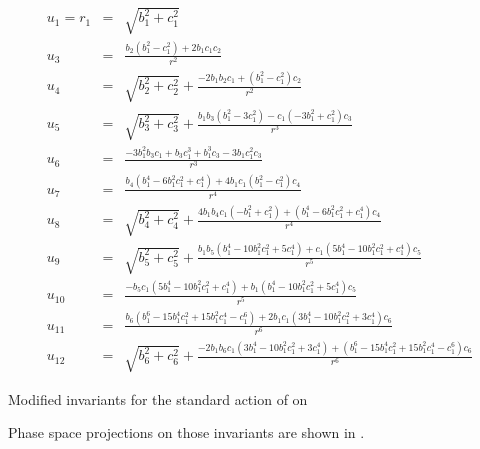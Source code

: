 \begin{table}
\begin{small}
\begin{eqnarray*}
  u_1=r_1 &=&\sqrt{b_1^2+c_1^2}\\ 
  u_3 &=&\frac{b_2 \left(b_1^2-c_1^2\right)+2 b_1 c_1 c_2}{r^2}\\ 
  u_4 &=&\sqrt{b_2^2+c_2^2}+\frac{-2
b_1 b_2 c_1+\left(b_1^2-c_1^2\right) c_2}{r^2}\\ 
  u_5 &=&\sqrt{b_3^2+c_3^2}+\frac{b_1 b_3 \left(b_1^2-3 c_1^2\right)-c_1 \left(-3
b_1^2+c_1^2\right) c_3}{r^3}\\ 
  u_6 &=&\frac{-3 b_1^2 b_3 c_1+b_3 c_1^3+b_1^3 c_3-3 b_1 c_1^2 c_3}{r^3}\\
  u_7 &=&\frac{b_4
\left(b_1^4-6 b_1^2 c_1^2+c_1^4\right)+4 b_1 c_1 \left(b_1^2-c_1^2\right) c_4}{r^4}\\
  u_8 &=&\sqrt{b_4^2+c_4^2}+\frac{4 b_1
b_4 c_1 \left(-b_1^2+c_1^2\right)+\left(b_1^4-6 b_1^2 c_1^2+c_1^4\right) c_4}{r^4}\\ 
  u_9 &=&\sqrt{b_5^2+c_5^2}+\frac{b_1
b_5 \left(b_1^4-10 b_1^2 c_1^2+5 c_1^4\right)+c_1 \left(5 b_1^4-10 b_1^2 c_1^2+c_1^4\right) c_5}{r^5}\\ 
  u_{10} &=&\frac{-b_5
c_1 \left(5 b_1^4-10 b_1^2 c_1^2+c_1^4\right)+b_1 \left(b_1^4-10 b_1^2 c_1^2+5 c_1^4\right) c_5}{r^5}\\  
  u_{11} &=&\frac{b_6
\left(b_1^6-15 b_1^4 c_1^2+15 b_1^2 c_1^4-c_1^6\right)+2 b_1 c_1 \left(3 b_1^4-10 b_1^2 c_1^2+3 c_1^4\right) c_6}{r^6} \\
  u_{12} &=&\sqrt{b_6^2+c_6^2}+\frac{-2
b_1 b_6 c_1 \left(3 b_1^4-10 b_1^2 c_1^2+3 c_1^4\right)+\left(b_1^6-15 b_1^4 c_1^2+15 b_1^2 c_1^4-c_1^6\right) c_6}{r^6} 
\end{eqnarray*}
\caption[Modified invariants for SO(2), n=6.]{Modified invariants for the standard action of  on }
\label{tab:SO2n6modif}
\end{small}
\end{table}

Phase space projections on those invariants are shown in . 

